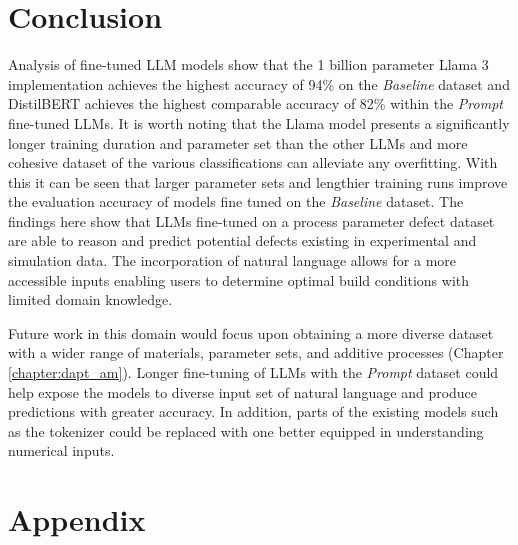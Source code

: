 \section{Conclusion}

Analysis of fine-tuned LLM models show that the 1 billion parameter Llama 3
implementation achieves the highest accuracy of 94\% on the \textit{Baseline}
dataset and DistilBERT achieves the highest comparable accuracy of 82\% within the
\textit{Prompt} fine-tuned LLMs. It is worth noting that the Llama model
presents a significantly longer training duration and parameter set than the
other LLMs and more cohesive dataset of the various classifications can alleviate any overfitting. With this it can be seen that larger parameter sets and lengthier
training runs improve the evaluation accuracy of models fine tuned on the
\textit{Baseline} dataset. The findings here show that LLMs fine-tuned on a
process parameter defect dataset are able to reason and predict potential
defects existing in experimental and simulation data. The incorporation of
natural language allows for a more accessible inputs enabling users to determine
optimal build conditions with limited domain knowledge.

Future work in this domain would focus upon obtaining a more diverse dataset
with a wider range of materials, parameter sets, and additive processes (Chapter
\ref{chapter:dapt_am}). Longer fine-tuning of LLMs with the \textit{Prompt}
dataset could help expose the models to diverse input set of natural language
and produce predictions with greater accuracy. In addition, parts of the
existing models such as the tokenizer could be replaced with one better equipped
in understanding numerical inputs.

\clearpage

\section{Appendix}
